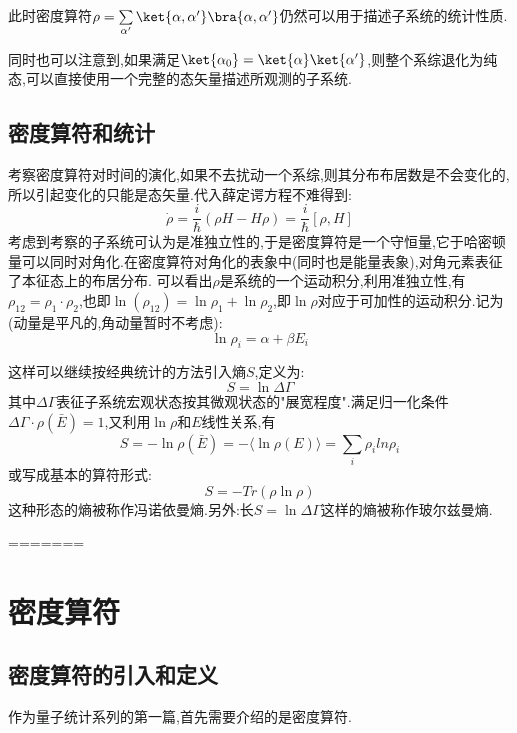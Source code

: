     此时密度算符$\rho=\sum\limits_{\alpha'}\ket{\alpha,\alpha'}\bra{\alpha,\alpha'}$仍然可以用于描述子系统的统计性质.

    同时也可以注意到,如果满足$\ket{\alpha_0}=\ket{\alpha}\ket{\alpha'}$,则整个系综退化为纯态,可以直接使用一个完整的态矢量描述所观测的子系统.

\subsection{密度算符和统计}
考察密度算符对时间的演化,如果不去扰动一个系综,则其分布布居数是不会变化的,所以引起变化的只能是态矢量.代入薛定谔方程不难得到:
\begin{equation}
    \dot{\rho}=\dfrac{i}{\hbar}(\rho H-H \rho)=\dfrac{i}{\hbar}\left[ \rho ,H\right] 
\end{equation}
考虑到考察的子系统可认为是准独立性的,于是密度算符是一个守恒量,它于哈密顿量可以同时对角化.在密度算符对角化的表象中(同时也是能量表象),对角元素表征了本征态上的布居分布.
可以看出$\rho$是系统的一个运动积分,利用准独立性,有$\rho_{12}=\rho_1\cdot \rho_2$,也即$\ln(\rho_{12})=\ln\rho_1+\ln\rho_2$,即$\ln\rho$对应于可加性的运动积分.记为(动量是平凡的,角动量暂时不考虑):
\begin{equation}
    \ln \rho_i=\alpha+\beta E_i
\end{equation}

这样可以继续按经典统计的方法引入熵$S$,定义为:
\begin{equation}
    S=\ln \Delta\Gamma
\end{equation}
其中$\Delta \Gamma$表征子系统宏观状态按其微观状态的"展宽程度".满足归一化条件$\Delta \Gamma \cdot \rho(\bar{E})=1$,又利用$\ln \rho$和$E$线性关系,有
\begin{equation}
    S=-\ln \rho(\bar{E})=-\langle \ln \rho(E) \rangle=\sum\limits_i \rho_i ln \rho_i
\end{equation}
或写成基本的算符形式:
\begin{equation}
    S=-Tr(\rho \ln \rho)
\end{equation}
这种形态的熵被称作冯诺依曼熵.另外:长$S=\ln\Delta\Gamma$这样的熵被称作玻尔兹曼熵.

=======

\section{密度算符}
\subsection{密度算符的引入和定义}
    作为量子统计系列的第一篇,首先需要介绍的是密度算符.
    
